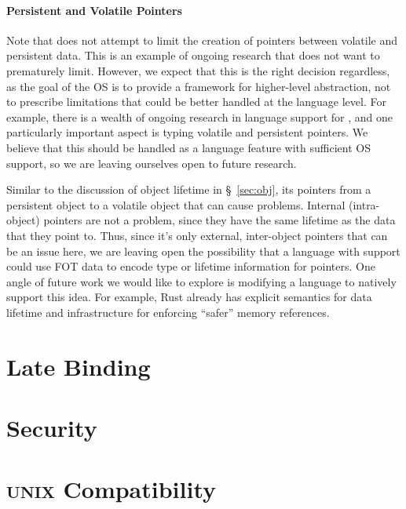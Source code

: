 {        \paragraph{Persistent and Volatile Pointers}

        Note that \Twizzler does not attempt to limit the creation of pointers between volatile and
        persistent data. This is an example of ongoing \NVM research that \Twizzler does not want to
        prematurely limit. However, we expect that this is the right decision regardless, as the goal of the
        OS is to provide a framework for higher-level abstraction, not to prescribe limitations that could
        be better handled at the language level. For example, there is a wealth of ongoing research in
        language support for \NVM {}, and one particularly important aspect is typing volatile and
        persistent pointers. We believe that this should be handled as a language feature with sufficient OS
        support, so we are leaving ourselves open to future research.

        Similar to the discussion of object lifetime in \S~\ref{sec:obj}, its pointers from a persistent
        object to a volatile object that can cause problems. Internal (intra-object) pointers are not a
        problem, since they have the same lifetime as the data that they point to. Thus, since it's only
        external, inter-object pointers that can be an issue here, we are leaving open the possibility that
        a language with \Twizzler support could use FOT data to encode type or lifetime information for
        pointers. One angle of future work we would like to explore is modifying a language to natively
        support this idea. For example, Rust already has explicit semantics for data lifetime and
        infrastructure for enforcing ``safer'' memory references.
    \fi
}


\section{Late Binding}


\section{Security}

\section{\textsc{unix} Compatibility}
\label{sec:legacy}


